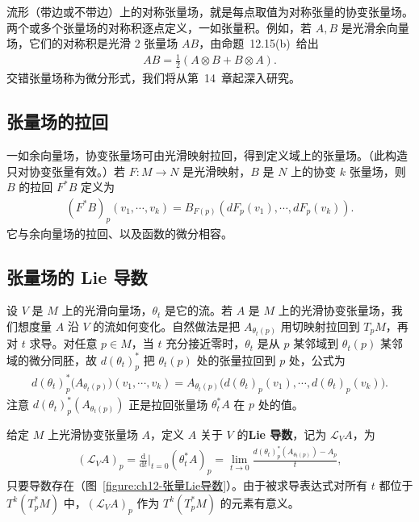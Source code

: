 \documentclass[../../main.tex]{subfiles}
\begin{document}
流形（带边或不带边）上的对称张量场，就是每点取值为对称张量的协变张量场。两个或多个张量场的对称积逐点定义，一如张量积。例如，若 $A,B$ 是光滑余向量场，它们的对称积是光滑 $2$ 张量场 $AB$，由命题~12.15(b)~给出
\begin{align*}
AB=\frac{1}{2}(A\otimes B+B\otimes A).
\end{align*}
交错张量场称为微分形式，我们将从第~14~章起深入研究。

\subsection*{张量场的拉回}

一如余向量场，协变张量场可由光滑映射拉回，得到定义域上的张量场。（此构造只对协变张量有效。）若 $F\colon M\to N$ 是光滑映射，$B$ 是 $N$ 上的协变 $k$ 张量场，则 $B$ 的拉回 $F^*B$ 定义为
\begin{align*}
(F^*B)_p(v_1,\cdots ,v_k)=B_{F(p)}(dF_p(v_1),\cdots ,dF_p(v_k)).
\end{align*}
它与余向量场的拉回、以及函数的微分相容。

\subsection*{张量场的 Lie 导数}

设 $V$ 是 $M$ 上的光滑向量场，$\theta_t$ 是它的流。若 $A$ 是 $M$ 上的光滑协变张量场，我们想度量 $A$ 沿 $V$ 的流如何变化。自然做法是把 $A_{\theta_t(p)}$ 用切映射拉回到 $T_pM$，再对 $t$ 求导。对任意 $p\in M$，当 $t$ 充分接近零时，$\theta_t$ 是从 $p$ 某邻域到 $\theta_t(p)$ 某邻域的微分同胚，故 $d(\theta_t)^*_p$ 把 $\theta_t(p)$ 处的张量拉回到 $p$ 处，公式为
\begin{align*}
d(\theta_t)^*_p\big(A_{\theta_t(p)}\big)(v_1,\cdots ,v_k)
=A_{\theta_t(p)}\big(d(\theta_t)_p(v_1),\cdots ,d(\theta_t)_p(v_k)\big).
\end{align*}
注意 $d(\theta_t)^*_p(A_{\theta_t(p)})$ 正是拉回张量场 $\theta_t^*A$ 在 $p$ 处的值。

给定 $M$ 上光滑协变张量场 $A$，定义 $A$ 关于 $V$ 的\textbf{Lie 导数}，记为 $\mathcal L_V A$，为
\begin{align}
(\mathcal L_V A)_p=\frac{\mathrm{d}}{\mathrm{d}t}\bigg|_{t=0}(\theta_t^*A)_p
=\lim_{t\to 0}\frac{d(\theta_t)^*_p(A_{\theta_t(p)})-A_p}{t},\label{align:ch12-张量Lie导数定义}
\end{align}
只要导数存在（图~\ref{figure:ch12-张量Lie导数}）。由于被求导表达式对所有 $t$ 都位于 $T^k(T_p^*M)$ 中，$(\mathcal L_V A)_p$ 作为 $T^k(T_p^*M)$ 的元素有意义。
\end{document}
